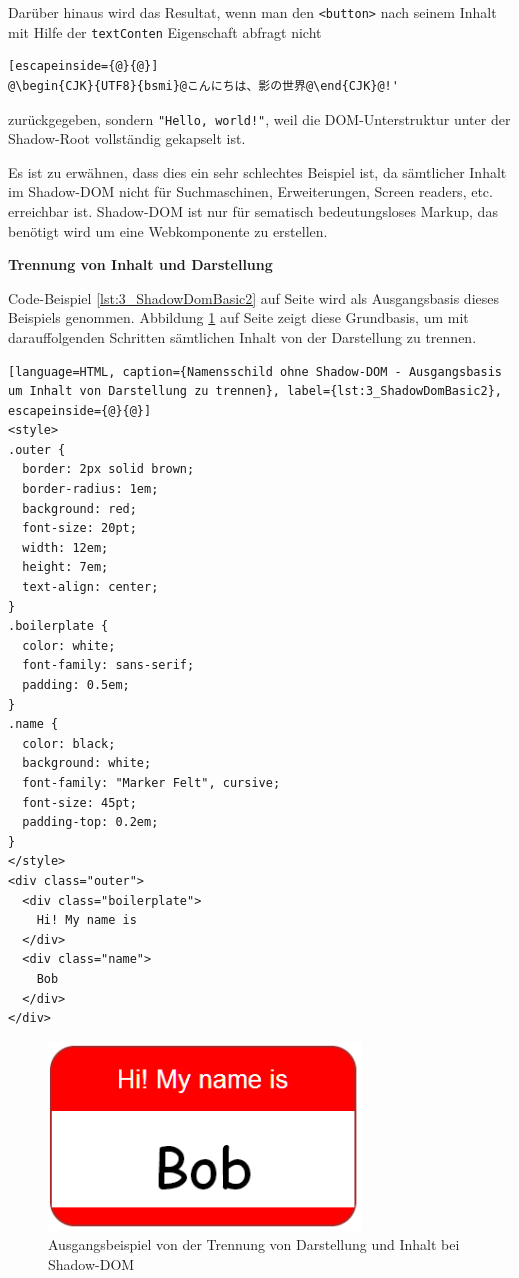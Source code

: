 Darüber hinaus wird das Resultat, wenn man den \lstinline|<button>| nach seinem Inhalt mit Hilfe der \lstinline|textConten| Eigenschaft abfragt nicht
\begin{lstlisting}[escapeinside={@}{@}]
@\begin{CJK}{UTF8}{bsmi}@こんにちは、影の世界@\end{CJK}@!'
\end{lstlisting}
zurückgegeben, sondern \lstinline|"Hello, world!"|, weil die DOM-Unterstruktur unter der Shadow-Root vollständig gekapselt ist.

Es ist zu erwähnen, dass dies ein sehr schlechtes Beispiel ist, da sämtlicher Inhalt im Shadow-DOM nicht für Suchmaschinen, Erweiterungen, Screen readers, etc. erreichbar ist. Shadow-DOM ist nur für sematisch bedeutungsloses Markup, das benötigt wird um eine Webkomponente zu erstellen.

\textbf{Trennung von Inhalt und Darstellung}

Code-Beispiel \ref{lst:3_ShadowDomBasic2} auf Seite \pageref{lst:3_ShadowDomBasic2} wird als Ausgangsbasis dieses Beispiels genommen. Abbildung \ref{fig:3_ShadowDom2} auf Seite \pageref{fig:3_ShadowDom2} zeigt diese Grundbasis, um mit darauffolgenden Schritten sämtlichen Inhalt von der Darstellung zu trennen.

\begin{lstlisting}[language=HTML, caption={Namensschild ohne Shadow-DOM - Ausgangsbasis um Inhalt von Darstellung zu trennen}, label={lst:3_ShadowDomBasic2}, escapeinside={@}{@}]
<style>
.outer {
  border: 2px solid brown;
  border-radius: 1em;
  background: red;
  font-size: 20pt;
  width: 12em;
  height: 7em;
  text-align: center;
}
.boilerplate {
  color: white;
  font-family: sans-serif;
  padding: 0.5em;
}
.name {
  color: black;
  background: white;
  font-family: "Marker Felt", cursive;
  font-size: 45pt;
  padding-top: 0.2em;
}
</style>
<div class="outer">
  <div class="boilerplate">
    Hi! My name is
  </div>
  <div class="name">
    Bob
  </div>
</div>
\end{lstlisting}

\begin{figure}[h]
\centering
\includegraphics[height=5.0cm]{images/SS3.png}
\caption[
  Ausgangsbeispiel von der Trennung von Darstellung und Inhalt bei Shadow-DOM
]{Ausgangsbeispiel von der Trennung von Darstellung und Inhalt bei Shadow-DOM}
\label{fig:3_ShadowDom2}
\end{figure}


